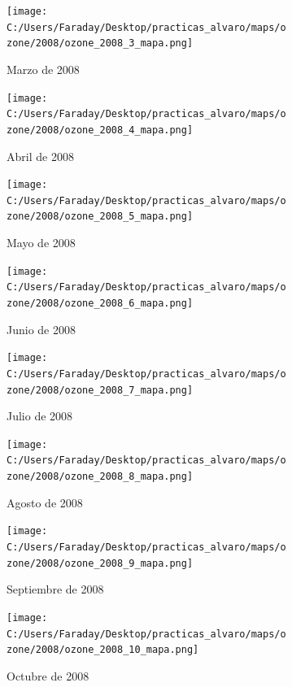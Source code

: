 \documentclass[12pt]{article}
\begin{document}
\begin{figure}[H]
\centering
\begin{subfigure}[h]{0.45\textwidth}
\texttt{[image: C:/Users/Faraday/Desktop/practicas\_alvaro/maps/ozone/2008/ozone\_2008\_3\_mapa.png]}
\caption{Marzo de 2008}
\label{fig:map-mon-2-3-2008}
\end{subfigure}
%
\begin{subfigure}[H]{0.45\textwidth}
\texttt{[image: C:/Users/Faraday/Desktop/practicas\_alvaro/maps/ozone/2008/ozone\_2008\_4\_mapa.png]}
\caption{Abril de 2008}
\label{fig:map-mon-2-4-2008}
\end{subfigure}
\caption{}
\end{figure}

\begin{figure}[H]
\centering
\begin{subfigure}[h]{0.45\textwidth}
\texttt{[image: C:/Users/Faraday/Desktop/practicas\_alvaro/maps/ozone/2008/ozone\_2008\_5\_mapa.png]}
\caption{Mayo de 2008}
\label{fig:map-mon-2-5-2008}
\end{subfigure}
%
\begin{subfigure}[H]{0.45\textwidth}
\texttt{[image: C:/Users/Faraday/Desktop/practicas\_alvaro/maps/ozone/2008/ozone\_2008\_6\_mapa.png]}
\caption{Junio de 2008}
\label{fig:map-mon-2-6-2008}
\end{subfigure}
\caption{}
\end{figure}

\newpage

\begin{figure}[H]
\centering
\begin{subfigure}[h]{0.45\textwidth}
\texttt{[image: C:/Users/Faraday/Desktop/practicas\_alvaro/maps/ozone/2008/ozone\_2008\_7\_mapa.png]}
\caption{Julio de 2008}
\label{fig:map-mon-2-7-2008}
\end{subfigure}
%
\begin{subfigure}[H]{0.45\textwidth}
\texttt{[image: C:/Users/Faraday/Desktop/practicas\_alvaro/maps/ozone/2008/ozone\_2008\_8\_mapa.png]}
\caption{Agosto de 2008}
\label{fig:map-mon-2-8-2008}
\end{subfigure}
\caption{}
\end{figure}

\begin{figure}[H]
\centering
\begin{subfigure}[h]{0.45\textwidth}
\texttt{[image: C:/Users/Faraday/Desktop/practicas\_alvaro/maps/ozone/2008/ozone\_2008\_9\_mapa.png]}
\caption{Septiembre de 2008}
\label{fig:map-mon-2-9-2008}
\end{subfigure}
%
\begin{subfigure}[H]{0.45\textwidth}
\texttt{[image: C:/Users/Faraday/Desktop/practicas\_alvaro/maps/ozone/2008/ozone\_2008\_10\_mapa.png]}
\caption{Octubre de 2008}
\label{fig:map-mon-2-10-2008}
\end{subfigure}
\caption{}
\end{figure}
\end{document}
